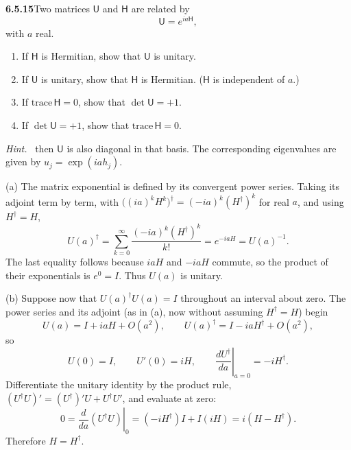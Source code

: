 \par\bigskip
\noindent\textbf{6.5.15}\quad Two matrices $\mathsf{U}$ and $\mathsf{H}$ are
related by
\[
\mathsf{U}=e^{ia\mathsf{H}},
\]
with $a$ real. 
\begin{enumerate}
\item[(a)] If $\mathsf{H}$ is Hermitian, show that $\mathsf{U}$ is unitary.
\item[(b)] If $\mathsf{U}$ is unitary, show that $\mathsf{H}$ is Hermitian.
  ($\mathsf{H}$ is independent of $a$.)
\item[(c)] If $\mathrm{trace}\,\mathsf{H}=0$, show that
  $\det\mathsf{U}=+1$.
\item[(d)] If $\det\mathsf{U}=+1$, show that
  $\mathrm{trace}\,\mathsf{H}=0$.
\end{enumerate}
\emph{Hint.}~ then $\mathsf{U}$ is also diagonal in that basis. The corresponding eigenvalues are given by
$u_{j}=\exp(iah_{j})$.
\solution
{}

(a) The matrix exponential is defined by its convergent power series.
Taking its adjoint term by term, with
$\bigl((ia)^kH^k\bigr)^\dagger=(-ia)^k(H^\dagger)^k$ for real $a$, and
using $H^\dagger=H$,
\[
U(a)^\dagger
=\sum_{k=0}^\infty\frac{(-ia)^k(H^\dagger)^k}{k!}
=e^{-iaH}=U(a)^{-1}.
\]
The last equality follows because $iaH$ and $-iaH$ commute, so the
product of their exponentials is $e^0=I$. Thus $U(a)$ is unitary.

(b) Suppose now that $U(a)^\dagger U(a)=I$ throughout an interval
about zero. The power series and its adjoint (as in (a), now without
assuming $H^\dagger=H$) begin
\[
U(a)=I+iaH+O(a^2),\qquad U(a)^\dagger=I-iaH^\dagger+O(a^2),
\]
so
\[
U(0)=I,\qquad U'(0)=iH,\qquad
\left.\frac{dU^\dagger}{da}\right|_{a=0}=-iH^\dagger.
\]
Differentiate the unitary identity by the product rule,
$(U^\dagger U)'=(U^\dagger)'U+U^\dagger U'$, and evaluate at zero:
\[
0=\left.\frac{d}{da}(U^\dagger U)\right|_{0}
=(-iH^\dagger)I+I(iH)=i(H-H^\dagger).
\]
Therefore $\boxed{H=H^\dagger}$.

